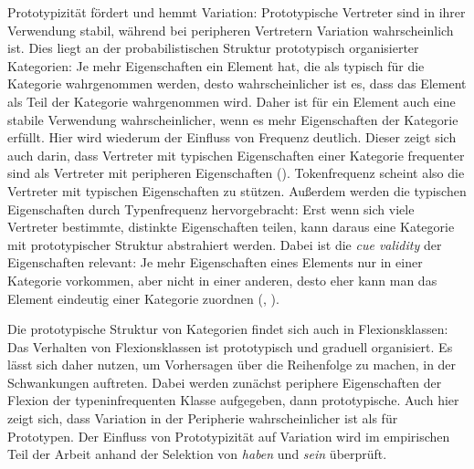  
Prototypizität fördert und hemmt Variation: Prototypische Vertreter sind in ihrer Verwendung stabil, während bei peripheren Vertretern Variation wahrscheinlich ist. Dies liegt an der probabilistischen Struktur prototypisch organisierter Kategorien: Je mehr Eigenschaften ein Element hat, die als typisch für die Kategorie wahrgenommen werden, desto wahrscheinlicher ist es, dass das Element als Teil der Kategorie wahrgenommen wird. Daher ist für ein Element auch eine stabile Verwendung wahrscheinlicher, wenn es mehr Eigenschaften der Kategorie erfüllt. Hier wird wiederum der Einfluss von Frequenz deutlich. Dieser zeigt sich auch darin, dass Vertreter mit typischen Eigenschaften einer Kategorie frequenter sind als Vertreter mit peripheren Eigenschaften (\cite[85]{Ellis.2014}). Tokenfrequenz scheint also die Vertreter mit typischen Eigenschaften zu stützen. Außerdem werden die typischen Eigenschaften durch Typenfrequenz hervorgebracht: Erst wenn sich viele Vertreter bestimmte, distinkte Eigenschaften teilen, kann daraus eine Kategorie mit prototypischer Struktur abstrahiert werden. Dabei ist die \textit{cue validity} der Eigenschaften relevant: Je mehr Eigenschaften eines Elements nur in einer Kategorie vorkommen, aber nicht in einer anderen, desto eher kann man das Element eindeutig einer Kategorie zuordnen (\cite[575]{Rosch.1975c}, \cite[52]{Kleiber.1993}).  



Die prototypische Struktur von Kategorien findet sich auch in Flexionsklassen: Das Verhalten von Flexionsklassen ist prototypisch und graduell organisiert. Es lässt sich daher nutzen, um Vorhersagen über die Reihenfolge zu machen, in der Schwankungen auftreten. Dabei werden zunächst periphere Eigenschaften der Flexion der typeninfrequenten Klasse aufgegeben, dann prototypische. Auch hier zeigt sich, dass Variation in der Peripherie wahrscheinlicher ist als für Prototypen. Der Einfluss von Prototypizität auf Variation wird im empirischen Teil der Arbeit anhand der Selektion von \textit{haben} und \textit{sein} überprüft.   

